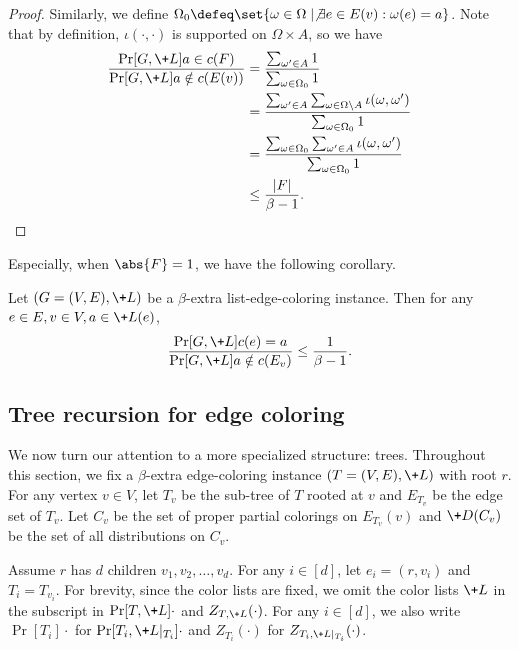 \begin{proof}
Similarly, we define $\Omega_0\defeq\set{\omega\in \Omega \mid \not\exists e\in E(v) : \omega(e) = a}$.
Note that by definition, $\iota(\cdot, \cdot)$ is supported on $\Omega\times A$, so we have
\begin{align*}
\frac{\Pr[G,\+L]{a\in c(F)}}{\Pr[G,\+L]{a\notin c(E(v))}}
&= \frac{\sum_{\omega'\in A}1}{\sum_{\omega\in \Omega_0} 1}\\
&= \frac{\sum_{\omega'\in A}\sum_{\omega\in \Omega\setminus A} \iota(\omega, \omega')}
        {\sum_{\omega\in \Omega_0} 1 }\\
&= \frac{\sum_{\omega\in \Omega_0} \sum_{\omega'\in A} \iota(\omega, \omega')}
        {\sum_{\omega\in \Omega_0} 1}\\
&\le \frac{|F|}{\beta-1}.
\end{align*}
\end{proof}

Especially, when $\abs{F}=1$, we have the following corollary.
\begin{corollary}\label{cor:marginal-bound-gamma-delta}
    Let $(G=(V, E), \+L)$ be a $\beta$-extra list-edge-coloring instance. Then for any $e\in E, v\in V, a\in \+L(e)$, 
    \[
    \frac{\Pr[G,\+L]{c(e)=a}}{\Pr[G,\+L]{a\notin c(E_v)}} \le \frac{1}{\beta-1}.
    \]
\end{corollary}

\subsection{Tree recursion for edge coloring}\label{sec:recursion}
We now turn our attention to a more specialized structure: trees. Throughout this section, we fix a $\beta$-extra edge-coloring instance $(T=(V,E),\+{L})$ with root $r$. For any vertex $v \in V$, let $T_v$ be the sub-tree of $T$ rooted at $v$ and $E_{T_v}$ be the edge set of $T_v$. Let $C_v$ be the set of proper partial colorings on $E_{T_v}(v)$ and $\+D(C_v)$ be the set of all distributions on $C_v$. 

Assume $r$ has $d$ children $v_1, v_2, \dots, v_d$. For any $i\in [d]$, let $e_i = (r, v_i)$ and $T_i = T_{v_i}$. For brevity, since the color lists are fixed, we omit the color lists $\+L$ in the subscript in $\Pr[T,\+L]{\cdot}$ and $Z_{T,\+L}(\cdot)$. For any $i\in [d]$, we also write $\Pr[T_i]{\cdot}$ for $\Pr[T_i, \+L|_{T_i}]{\cdot}$ and $Z_{T_i}(\cdot)$ for $Z_{T_i,\+L|_{T_i}}(\cdot)$.

